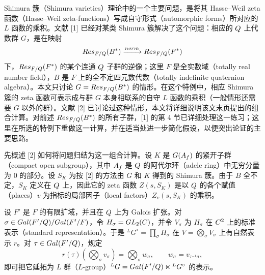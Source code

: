 
Shimura 簇（Shimura varieties）理论中的一个主要问题，是将其 Hasse--Weil zeta 函数（Hasse--Weil zeta-functions）写成自守形式（automorphic forms）所对应的 $L$ 函数的乘积。文献 [1] 已经对某类 Shimura 簇解决了这个问题：相应的 $Q$ 上代数群 $G$，是在映射
\[
Res_{F/Q}(B^*)\xrightarrow{norm}Res_{F/Q}(F^*)
\]
下，$Res_{F/Q}(F^*)$ 的某个连通 $Q$ 子群的逆像；这里 $F$ 是全实数域（totally real number field），$B$ 是 $F$ 上的全不定四元数代数（totally indefinite quaternion algebra）。本文只讨论 $G=Res_{F/Q}(B^*)$ 的情形。在这个特例中，相应 Shimura 簇的 zeta 函数可表示成与群 $G$ 本身相联系的自守 $L$ 函数的乘积（一般情形还需要 $G$ 以外的群）。文献 [2] 已讨论过这种情形，本文将详细说明该文末页提出的组合计算。对前述 $Res_{F/Q}(B^*)$ 的所有子群，[1] 的第 4 节已详细处理这一练习；这里在所选的特例下重做这一计算，并在适当处进一步简化假设，以便突出论证的主要思路。

先概述 [2] 如何将问题归结为这一组合计算。设 $K$ 是 $G(A_f)$ 的紧开子群（compact open subgroup），其中 $A_f$ 是 $Q$ 的阿代尔环（adele ring）中无穷分量为 $0$ 的部分。设 $S_K$ 为按 [2] 的方法由 $G$ 和 $K$ 得到的 Shimura 簇。由于 $B$ 全不定，$S_K$ 定义在 $Q$ 上，因此它的 zeta 函数 $Z(s,S_K)$ 是以 $Q$ 的各个赋值（places）$v$ 为指标的局部因子（local factors）$Z_v(s,S_K)$ 的乘积。

设 $F'$ 是 $F$ 的有限扩域，并且在 $Q$ 上为 Galois 扩张。对
$\sigma\in Gal(F'/Q)/Gal(F'/F)$，令 $H_\sigma=GL_2(C)$，并令 $V_\sigma$ 为 $H_\sigma$ 在 $C^2$ 上的标准表示（standard representation）。于是 ${}^LG^\circ=\prod_\sigma H_\sigma$ 在 $V=\bigotimes_\sigma V_\sigma$ 上有自然表示 $r$。对 $\tau\in Gal(F'/Q)$，规定
\[
r(\tau)(\bigotimes_\sigma v_\sigma)=\bigotimes_\sigma w_\sigma,
\qquad w_\sigma=v_{\tau^{-1}\sigma},
\]
即可把它延拓为 $L$ 群（$L$-group）${}^LG=Gal(F'/Q)\ltimes{}^LG^\circ$ 的表示。

